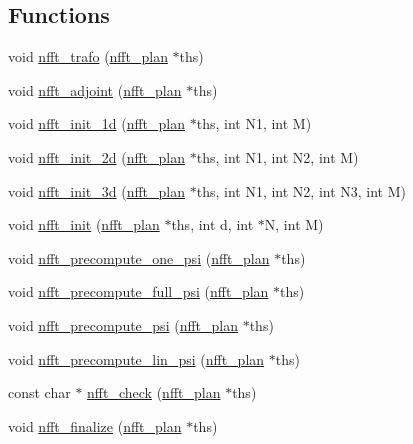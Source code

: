 \subsection*{Functions}
\begin{DoxyCompactItemize}
\item 
void \hyperlink{group__nfft_ga9f1e6bd9f7f956a8679e6b413c97b421}{nfft\-\_\-trafo} (\hyperlink{structnfft__plan}{nfft\-\_\-plan} $\ast$ths)
\item 
void \hyperlink{group__nfft_ga4b44c1dd52026dcb494dc735f0fa5b08}{nfft\-\_\-adjoint} (\hyperlink{structnfft__plan}{nfft\-\_\-plan} $\ast$ths)
\item 
void \hyperlink{group__nfft_ga01dbd2cfc9cc8577fc097e607e3c845f}{nfft\-\_\-init\-\_\-1d} (\hyperlink{structnfft__plan}{nfft\-\_\-plan} $\ast$ths, int N1, int M)
\item 
void \hyperlink{group__nfft_ga54ab08124f47fe412b2979abdc28cc16}{nfft\-\_\-init\-\_\-2d} (\hyperlink{structnfft__plan}{nfft\-\_\-plan} $\ast$ths, int N1, int N2, int M)
\item 
void \hyperlink{group__nfft_ga67493342a23bdbb4301063f96e13fd88}{nfft\-\_\-init\-\_\-3d} (\hyperlink{structnfft__plan}{nfft\-\_\-plan} $\ast$ths, int N1, int N2, int N3, int M)
\item 
void \hyperlink{group__nfft_ga1dfeaf18f3735f035afa62ca768d99c4}{nfft\-\_\-init} (\hyperlink{structnfft__plan}{nfft\-\_\-plan} $\ast$ths, int d, int $\ast$N, int M)
\item 
void \hyperlink{group__nfft_gafd7b278b6ed04d929212b4807dd195f0}{nfft\-\_\-precompute\-\_\-one\-\_\-psi} (\hyperlink{structnfft__plan}{nfft\-\_\-plan} $\ast$ths)
\item 
void \hyperlink{group__nfft_gaee7a88956c66b2113014084d6dd04b3a}{nfft\-\_\-precompute\-\_\-full\-\_\-psi} (\hyperlink{structnfft__plan}{nfft\-\_\-plan} $\ast$ths)
\item 
void \hyperlink{group__nfft_gae6a8367b03fd75b2af42dbbaccb78bf2}{nfft\-\_\-precompute\-\_\-psi} (\hyperlink{structnfft__plan}{nfft\-\_\-plan} $\ast$ths)
\item 
void \hyperlink{group__nfft_ga3f91a7a005cc31a8b05f33fea0507ddc}{nfft\-\_\-precompute\-\_\-lin\-\_\-psi} (\hyperlink{structnfft__plan}{nfft\-\_\-plan} $\ast$ths)
\item 
const char $\ast$ \hyperlink{group__nfft_ga7af648ae0503976536b8db18200f99fe}{nfft\-\_\-check} (\hyperlink{structnfft__plan}{nfft\-\_\-plan} $\ast$ths)
\item 
void \hyperlink{group__nfft_ga614f9f7af5b0d5491afa9495393c4dc3}{nfft\-\_\-finalize} (\hyperlink{structnfft__plan}{nfft\-\_\-plan} $\ast$ths)
\end{DoxyCompactItemize}


